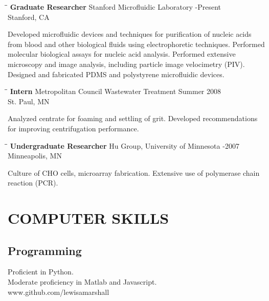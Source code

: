 \documentclass{res}
\begin{document}
\begin{resume}
   \begin{tabbing}
   \hspace{2.1in}\= \hspace{2.9in}\= \kill %
    {\bf Graduate Researcher} \>Stanford Microfluidic Laboratory    -Present\\
                             \>Stanford, CA
   \end{tabbing}\vspace{-20pt}      %
    Developed microfluidic devices and techniques for purification of nucleic acids from blood and other biological fluids using electrophoretic techniques. Performed molecular biological assays for nucleic acid analysis. Performed extensive microscopy and image analysis, including particle image velocimetry (PIV). Designed and fabricated PDMS and polystyrene microfluidic devices.
   \begin{tabbing}

   \hspace{2.1in}\= \hspace{2.9in}\= \kill %
    {\bf Intern} \>Metropolitan Council Wastewater Treatment \>  Summer 2008\\
                          \>St. Paul, MN
   \end{tabbing}\vspace{-20pt}
    Analyzed centrate for foaming and settling of grit. Developed recommendations for improving centrifugation performance.
   \begin{tabbing}%
   \hspace{2.1in}\= \hspace{2.9in}\= \kill %
   {\bf Undergraduate Researcher}  \>Hu Group, University of Minnesota -2007\\
                          \>Minneapolis, MN
   \end{tabbing}\vspace{-20pt}
    Culture of CHO cells, microarray fabrication. Extensive use of polymerase chain reaction (PCR).


 \section{COMPUTER SKILLS}
 	\subsection{Programming}
 	Proficient in Python.\\
  Moderate proficiency in Matlab and Javascript.\\
  www.github.com/lewisamarshall

\end{resume}
\end{document}
